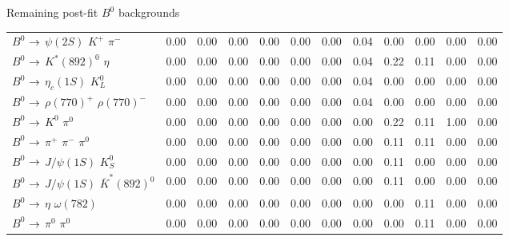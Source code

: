 \documentclass[xcolor=dvipsnames]{beamer}
\begin{document}
\begin{frame}{Remaining post-fit $B^0$ backgrounds}
{{\begin{tabular}{lrrrrrrrrrrr}
      $B^{0}$ $\rightarrow$ $\psi(2S)$ $K^{+}$ $\pi^{-}$              &         0.00 &         0.00 &         0.00 &         0.00 &         0.00 &         0.00 &         0.04 &         0.00 &         0.00 &         0.00 &         0.00 \\
      $B^{0}$ $\rightarrow$ $K^{*}(892)^{0}$ $\eta$                   &         0.00 &         0.00 &         0.00 &         0.00 &         0.00 &         0.00 &         0.04 &         0.22 &         0.11 &         0.00 &         0.00 \\
      $B^{0}$ $\rightarrow$ $\eta_{c}(1S)$ $K_{L}^{0}$                &         0.00 &         0.00 &         0.00 &         0.00 &         0.00 &         0.00 &         0.04 &         0.00 &         0.00 &         0.00 &         0.00 \\
      $B^{0}$ $\rightarrow$ $\rho(770)^{+}$ $\rho(770)^{-}$           &         0.00 &         0.00 &         0.00 &         0.00 &         0.00 &         0.00 &         0.04 &         0.00 &         0.00 &         0.00 &         0.00 \\
      $B^{0}$ $\rightarrow$ $K^{0}$ $\pi^{0}$                         &         0.00 &         0.00 &         0.00 &         0.00 &         0.00 &         0.00 &         0.00 &         0.22 &         0.11 &         1.00 &         0.00 \\
      $B^{0}$ $\rightarrow$ $\pi^{+}$ $\pi^{-}$ $\pi^{0}$             &         0.00 &         0.00 &         0.00 &         0.00 &         0.00 &         0.00 &         0.00 &         0.11 &         0.11 &         0.00 &         0.00 \\
      $B^{0}$ $\rightarrow$ $J/\psi(1S)$ $K_{S}^{0}$                  &         0.00 &         0.00 &         0.00 &         0.00 &         0.00 &         0.00 &         0.00 &         0.11 &         0.00 &         0.00 &         0.00 \\
      $B^{0}$ $\rightarrow$ $J/\psi(1S)$ $\overline{K}^{*}(892)^{0}$  &         0.00 &         0.00 &         0.00 &         0.00 &         0.00 &         0.00 &         0.00 &         0.11 &         0.00 &         0.00 &         0.00 \\
      $B^{0}$ $\rightarrow$ $\eta$ $\omega(782)$                      &         0.00 &         0.00 &         0.00 &         0.00 &         0.00 &         0.00 &         0.00 &         0.00 &         0.11 &         0.00 &         0.00 \\
      $B^{0}$ $\rightarrow$ $\pi^{0}$ $\pi^{0}$                       &         0.00 &         0.00 &         0.00 &         0.00 &         0.00 &         0.00 &         0.00 &         0.00 &         0.11 &         0.00 &         0.00 \\

\end{tabular}}}
\end{frame}
\end{document}
